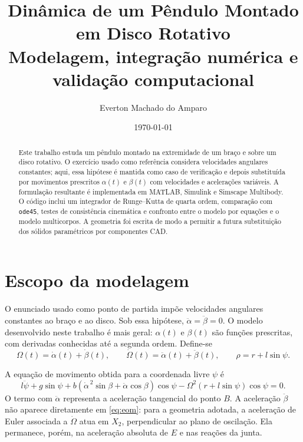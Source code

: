 \documentclass[11pt,a4paper]{article}
\title{\textbf{Dinâmica de um Pêndulo Montado em Disco Rotativo}\\
\large Modelagem, integração numérica e validação computacional}
\author{Everton Machado do Amparo}
\date{\today}
\begin{document}
\maketitle

\begin{abstract}
Este trabalho estuda um pêndulo montado na extremidade de um braço e sobre um
disco rotativo. O exercício usado como referência considera velocidades
angulares constantes; aqui, essa hipótese é mantida como caso de verificação e
depois substituída por movimentos prescritos $\alpha(t)$ e $\beta(t)$ com
velocidades e acelerações variáveis. A formulação resultante é implementada em
MATLAB, Simulink e Simscape Multibody. O código inclui um integrador de
Runge--Kutta de quarta ordem, comparação com \texttt{ode45}, testes de
consistência cinemática e confronto entre o modelo por equações e o modelo
multicorpos. A geometria foi escrita de modo a permitir a futura substituição
dos sólidos paramétricos por componentes CAD.
\end{abstract}

\tableofcontents

\section{Escopo da modelagem}

O enunciado usado como ponto de partida impõe velocidades angulares constantes
ao braço e ao disco. Sob essa hipótese,
$\ddot\alpha=\ddot\beta=0$. O modelo desenvolvido neste trabalho é mais geral:
$\alpha(t)$ e $\beta(t)$ são funções prescritas, com derivadas conhecidas até a
segunda ordem. Define-se
\begin{equation}
\Omega(t)=\dot\alpha(t)+\dot\beta(t), \qquad
\dot\Omega(t)=\ddot\alpha(t)+\ddot\beta(t), \qquad
\rho=r+l\sin\psi.
\label{eq:definitions}
\end{equation}

A equação de movimento obtida para a coordenada livre $\psi$ é
\begin{equation}
\boxed{
l\ddot\psi+g\sin\psi
+b\left(\dot\alpha^{\,2}\sin\beta+\ddot\alpha\cos\beta\right)\cos\psi
-\Omega^2\left(r+l\sin\psi\right)\cos\psi=0.}
\label{eq:eom}
\end{equation}
O termo com $\ddot\alpha$ representa a aceleração tangencial do ponto $B$. A
aceleração $\ddot\beta$ não aparece diretamente em \cref{eq:eom}: para a
geometria adotada, a aceleração de Euler associada a $\dot\Omega$ atua em
$X_2$, perpendicular ao plano de oscilação. Ela permanece, porém, na aceleração
absoluta de $E$ e nas reações da junta.
\end{document}

